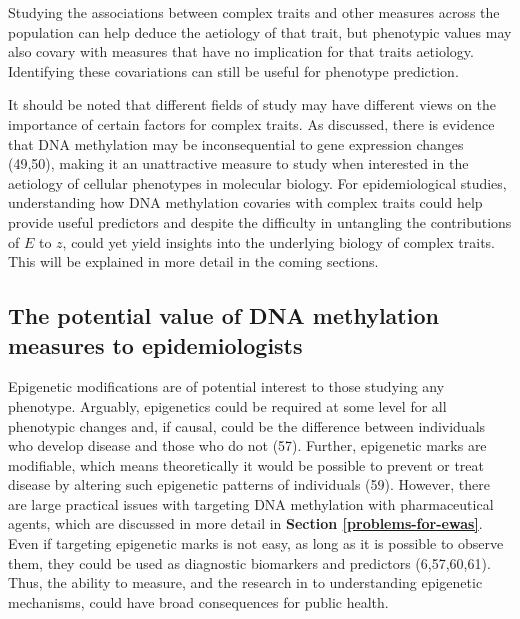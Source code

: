 \documentclass[11pt,twoside]{bristolthesis}
\begin{document}
Studying the associations between complex traits and other measures across the population can help deduce the aetiology of that trait, but phenotypic values may also covary with measures that have no implication for that traits aetiology. Identifying these covariations can still be useful for phenotype prediction.

It should be noted that different fields of study may have different views on the importance of certain factors for complex traits. As discussed, there is evidence that DNA methylation may be inconsequential to gene expression changes (49,50), making it an unattractive measure to study when interested in the aetiology of cellular phenotypes in molecular biology. For epidemiological studies, understanding how DNA methylation covaries with complex traits could help provide useful predictors and despite the difficulty in untangling the contributions of \(E\) to \(z\), could yet yield insights into the underlying biology of complex traits. This will be explained in more detail in the coming sections.

\hypertarget{appeal-of-dnam}{%
\subsection{The potential value of DNA methylation measures to epidemiologists}\label{appeal-of-dnam}}

Epigenetic modifications are of potential interest to those studying any phenotype. Arguably, epigenetics could be required at some level for all phenotypic changes and, if causal, could be the difference between individuals who develop disease and those who do not (57). Further, epigenetic marks are modifiable, which means theoretically it would be possible to prevent or treat disease by altering such epigenetic patterns of individuals (59). However, there are large practical issues with targeting DNA methylation with pharmaceutical agents, which are discussed in more detail in \textbf{Section \ref{problems-for-ewas}}. Even if targeting epigenetic marks is not easy, as long as it is possible to observe them, they could be used as diagnostic biomarkers and predictors (6,57,60,61). Thus, the ability to measure, and the research in to understanding epigenetic mechanisms, could have broad consequences for public health.
\end{document}
